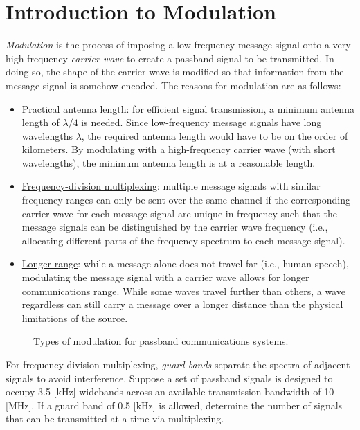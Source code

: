 \documentclass{report}
\begin{document}
\section{Introduction to Modulation}
\emph{Modulation} is the process of imposing a low-frequency message signal onto a very high-frequency \emph{carrier wave} to create a passband signal to be transmitted. In doing so, the shape of the carrier wave 
is modified so that information from the message signal is somehow encoded. The reasons for modulation are as follows:
\begin{itemize}
    \item \underline{Practical antenna length}: for efficient signal transmission, a minimum antenna length of $\lambda/4$ is needed. Since low-frequency message signals have long wavelengths $\lambda$, the required antenna length 
    would have to be on the order of kilometers. By modulating with a high-frequency carrier wave (with short wavelengths), the minimum antenna length is at a reasonable length.
    \item \underline{Frequency-division multiplexing}: multiple message signals with similar frequency ranges can only be sent over the same channel if the corresponding carrier wave for each message signal are unique in frequency such that 
    the message signals can be distinguished by the carrier wave frequency (i.e., allocating different parts of the frequency spectrum to each message signal).
    \item \underline{Longer range}: while a message alone does not travel far (i.e., human speech), modulating the message signal with a carrier wave allows for longer communications range. While some waves travel further than others, 
    a wave regardless can still carry a message over a longer distance than the physical limitations of the source.
\end{itemize}
\begin{sidewaysfigure}
    \caption{Types of modulation for passband communications systems.}
    \label{modulation}
    \centering
    \resizebox{0.95\textwidth}{!}{%
        
    }
\end{sidewaysfigure}
\begin{example}
    For frequency-division multiplexing, \emph{guard bands} separate the spectra of adjacent signals to avoid interference. Suppose a set of passband signals is designed to occupy 3.5 [kHz] widebands across an 
    available transmission bandwidth of 10 [MHz]. If a guard band of 0.5 [kHz] is allowed, determine the number of signals that can be transmitted at a time via multiplexing.
\end{example}
\end{document}
